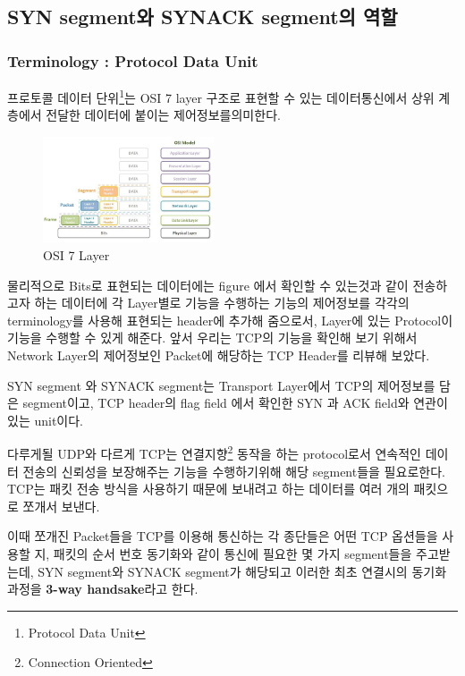 \subsection{SYN segment와 SYNACK segment의 역할}
    \subsubsection*{Terminology : Protocol Data Unit}
    프로토콜 데이터 단위\footnote{Protocol Data Unit}는 OSI 7 layer 구조로 표현할 수 있는 데이터통신에서
    상위 계층에서 전달한 데이터에 붙이는 제어정보를의미한다. 
    \vspace{-2mm}  
    \begin{figure} \vspace{-20pt}
    \begin{center}
    \includegraphics[width=0.45\textwidth]{image/week01/1-2-1.png}    
    \end{center}
    \vspace{-20pt}
    \caption{\small OSI 7 Layer}
    \vspace{-10pt}
    \end{figure}
    물리적으로 Bits로 표현되는 데이터에는 figure 에서 확인할 수 있는것과 같이 전송하고자 하는 데이터에
    각 Layer별로 기능을 수행하는 기능의 제어정보를 각각의 terminology를 사용해 표현되는 header에 
    추가해 줌으로서, Layer에 있는 Protocol이 기능을 수행할 수 있게 해준다.
    앞서 우리는 TCP의 기능을 확인해 보기 위해서 Network Layer의 제어정보인 Packet에 해당하는 TCP Header를 리뷰해 보았다.

    SYN segment 와 SYNACK segment는 Transport Layer에서 TCP의 제어정보를 담은 segment이고, TCP header의 flag field
    에서 확인한 SYN 과 ACK field와 연관이 있는 unit이다. 
    
    다루게될 UDP와 다르게 TCP는 연결지향\footnote{Connection Oriented} 동작을 하는 protocol로서 연속적인 데이터 전송의
    신뢰성을 보장해주는 기능을 수행하기위해 해당 segment들을 필요로한다. TCP는 패킷 전송 방식을 사용하기 때문에 보내려고 하는 데이터를 여러 개의 패킷으로 쪼개서 보낸다.

    이때 쪼개진 Packet들을 TCP를 이용해 통신하는 각 종단들은 어떤 TCP 옵션들을 사용할 지, 패킷의 순서 번호 동기화와 같이 통신에 필요한 몇 가지 segment들을 주고받는데, SYN segment와 SYNACK segment가 해당되고 이러한 최초 연결시의 
    동기화 과정을 \textbf{3-way handsake}라고 한다.
